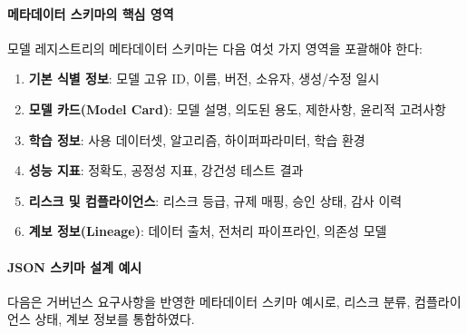 \paragraph{메타데이터 스키마의 핵심 영역}

모델 레지스트리의 메타데이터 스키마는 다음 여섯 가지 영역을 포괄해야 한다:

\begin{enumerate}
  \item \textbf{기본 식별 정보}: 모델 고유 ID, 이름, 버전, 소유자, 생성/수정 일시
  \item \textbf{모델 카드(Model Card)}: 모델 설명, 의도된 용도, 제한사항, 윤리적 고려사항
  \item \textbf{학습 정보}: 사용 데이터셋, 알고리즘, 하이퍼파라미터, 학습 환경
  \item \textbf{성능 지표}: 정확도, 공정성 지표, 강건성 테스트 결과
  \item \textbf{리스크 및 컴플라이언스}: 리스크 등급, 규제 매핑, 승인 상태, 감사 이력
  \item \textbf{계보 정보(Lineage)}: 데이터 출처, 전처리 파이프라인, 의존성 모델
\end{enumerate}

\paragraph{JSON 스키마 설계 예시}

다음은 거버넌스 요구사항을 반영한 메타데이터 스키마 예시로, 리스크 분류, 컴플라이언스 상태, 계보 정보를 통합하였다.

